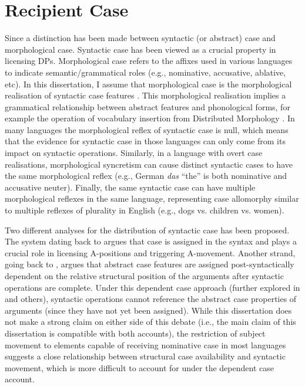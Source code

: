 \section{Recipient Case}
Since \cite{Vergnaud.1977} a distinction has been made between syntactic (or abstract) case and morphological case. Syntactic case has been viewed as a crucial property in licensing DPs. Morphological case refers to the affixes used in various languages to indicate semantic/grammatical roles (e.g., nominative, accusative, ablative, etc). In this dissertation, I assume that morphological case is the morphological realisation of syntactic case features \citep{Legate.2008}. This morphological realisation implies a grammatical relationship between abstract features and phonological forms, for example the operation of vocabulary insertion from Distributed Morphology \citep{Halle.1993}. In many languages the morphological reflex of syntactic case is null, which means that the evidence for syntactic case in those languages can only come from its impact on syntactic operations. Similarly, in a language with overt case realisations, morphological syncretism can cause distinct syntactic cases to have the same morphological reflex (e.g., German \textit{das} ``the'' is both nominative and accusative neuter). Finally, the same syntactic case can have multiple morphological reflexes in the same language, representing case allomorphy similar to multiple reflexes of plurality in English (e.g., dogs vs. children vs. women).

Two different analyses for the distribution of syntactic case has been proposed. The system dating back to \cite{Vergnaud.1977} argues that case is assigned in the syntax and plays a crucial role in licensing A-positions and triggering A-movement. Another strand, going back to \cite{Yip.1987}, argues that abstract case features are assigned post-syntactically dependent on the relative structural position of the arguments after syntactic operations are complete. Under this dependent case approach (further explored in \citealt{Marantz.1991,McFadden.2004} and others), syntactic operations cannot reference the abstract case properties of arguments (since they have not yet been assigned). While this dissertation does not make a strong claim on either side of this debate (i.e., the main claim of this dissertation is compatible with both accounts), the restriction of subject movement to elements capable of receiving nominative case in most languages suggests a close relationship between structural case availability and syntactic movement, which is more difficult to account for under the dependent case account.

